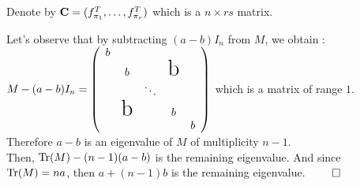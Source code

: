 Denote by $\bold{C} = (f_{\pi_{1}}^{T},\dots,f_{\pi_{r}}^{T})$ which is a $ n \times r s$ matrix.\\


\pr

Let's observe that by subtracting $(a-b) I_{n}$ from $M$, we obtain : $M-(a-b)I_{n} = \left(
    \begin{array}{ccccc}
    b                                    \\
      & b             &   & \text{\huge b}\\
      &               & \ddots               \\
      & \text{\huge b} &   & b            \\
      &               &   &   & b
    \end{array}
    \right)$ which is a matrix of range $1$. Therefore $a-b$ is an eigenvalue of $M$ of multiplicity $n-1$.\\
    Then, $\operatorname{Tr}(M) - (n-1) (a-b)$ is the remaining eigenvalue. And since $\operatorname{Tr}(M) = na$, then $a+(n-1)b$ is the remaining eigenvalue. $\qed$


 


